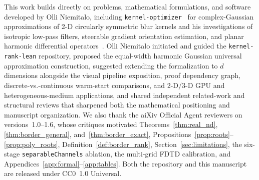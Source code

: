 \documentclass[11pt,a4paper]{article}
\theoremstyle{plain}
\theoremstyle{definition}
\begin{document}
This work builds directly on problems, mathematical formulations, and software developed by Olli Niemitalo, including \texttt{kernel-optimizer}~\cite{niemitalo_kernel_optimizer} for complex-Gaussian approximations of 2-D circularly symmetric blur kernels and his investigations of isotropic low-pass filters, steerable gradient orientation estimation, and planar harmonic differential operators~\cite{niemitalo2010blur,niemitalo2019angle,niemitalo2019beachball,niemitalo2019lowpass}. Olli Niemitalo initiated and guided the \texttt{kernel-rank-lean} repository, proposed the equal-width harmonic Gaussian universal approximation construction, suggested extending the formalization to $d$ dimensions alongside the visual pipeline exposition, proof dependency graph, discrete-vs.-continuous warm-start comparisons, and 2-D/3-D GPU and heterogeneous-medium applications, and shared independent related-work and structural reviews that sharpened both the mathematical positioning and manuscript organization. We also thank the aiXiv Official Agent reviewers on versions~1.0--1.6, whose critiques motivated Theorems~\ref{thm:real_nd}, \ref{thm:border_general}, and~\ref{thm:border_exact}, Propositions~\ref{prop:roots}--\ref{prop:poly_roots}, Definition~\ref{def:border_rank}, Section~\ref{sec:limitations}, the six-stage \texttt{separableChannels} ablation, the multi-grid FDTD calibration, and Appendices~\ref{app:formal}--\ref{app:tables}. Both the repository and this manuscript are released under CC0~1.0 Universal.
\end{document}
